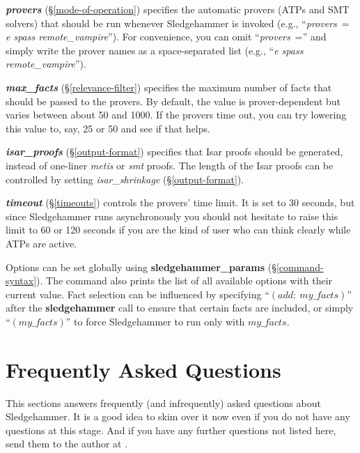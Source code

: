 \documentclass[a4paper,12pt]{article}
\begin{document}
\begin{enum}
\item[\labelitemi] \textbf{\textit{provers}} (\S\ref{mode-of-operation}) specifies
the automatic provers (ATPs and SMT solvers) that should be run whenever
Sledgehammer is invoked (e.g., ``\textit{provers}~= \textit{e spass
remote\_vampire\/}''). For convenience, you can omit ``\textit{provers}~=''
and simply write the prover names as a space-separated list (e.g., ``\textit{e
spass remote\_vampire\/}'').

\item[\labelitemi] \textbf{\textit{max\_facts}} (\S\ref{relevance-filter})
specifies the maximum number of facts that should be passed to the provers. By
default, the value is prover-dependent but varies between about 50 and 1000. If
the provers time out, you can try lowering this value to, say, 25 or 50 and see
if that helps.

\item[\labelitemi] \textbf{\textit{isar\_proofs}} (\S\ref{output-format}) specifies
that Isar proofs should be generated, instead of one-liner \textit{metis} or
\textit{smt} proofs. The length of the Isar proofs can be controlled by setting
\textit{isar\_shrinkage} (\S\ref{output-format}).

\item[\labelitemi] \textbf{\textit{timeout}} (\S\ref{timeouts}) controls the
provers' time limit. It is set to 30 seconds, but since Sledgehammer runs
asynchronously you should not hesitate to raise this limit to 60 or 120 seconds
if you are the kind of user who can think clearly while ATPs are active.
\end{enum}

Options can be set globally using \textbf{sledgehammer\_params}
(\S\ref{command-syntax}). The command also prints the list of all available
options with their current value. Fact selection can be influenced by specifying
``$(\textit{add}{:}~\textit{my\_facts})$'' after the \textbf{sledgehammer} call
to ensure that certain facts are included, or simply ``$(\textit{my\_facts})$''
to force Sledgehammer to run only with $\textit{my\_facts}$.

\section{Frequently Asked Questions}
\label{frequently-asked-questions}

This sections answers frequently (and infrequently) asked questions about
Sledgehammer. It is a good idea to skim over it now even if you do not have any
questions at this stage. And if you have any further questions not listed here,
send them to the author at \authoremail.
\end{document}
